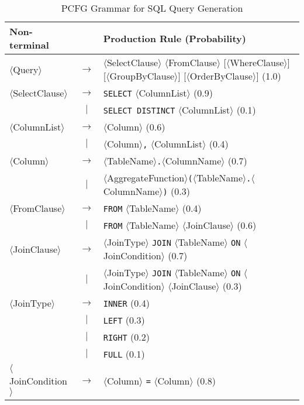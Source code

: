 \begin{table*}[!h]
\centering
\caption{PCFG Grammar for SQL Query Generation}
\label{tab:sql-pcfg}
\begin{tabular}{l@{\ }c@{\ }l}
\toprule
Non-terminal && Production Rule (Probability) \\
\midrule
$\langle$Query$\rangle$ & $\rightarrow$ & $\langle$SelectClause$\rangle$ $\langle$FromClause$\rangle$ [$\langle$WhereClause$\rangle$] [$\langle$GroupByClause$\rangle$] [$\langle$OrderByClause$\rangle$]  (1.0) \\[1ex]
$\langle$SelectClause$\rangle$ & $\rightarrow$ & \texttt{SELECT} $\langle$ColumnList$\rangle$  (0.9) \\
& $|$ & \texttt{SELECT DISTINCT} $\langle$ColumnList$\rangle$  (0.1) \\[1ex]
$\langle$ColumnList$\rangle$ & $\rightarrow$ & $\langle$Column$\rangle$  (0.6) \\
& $|$ & $\langle$Column$\rangle$\texttt{,} $\langle$ColumnList$\rangle$  (0.4) \\[1ex]
$\langle$Column$\rangle$ & $\rightarrow$ & $\langle$TableName$\rangle$\texttt{.}$\langle$ColumnName$\rangle$  (0.7) \\
& $|$ & $\langle$AggregateFunction$\rangle$\texttt{(}$\langle$TableName$\rangle$\texttt{.}$\langle$ColumnName$\rangle$\texttt{)}  (0.3) \\[1ex]
$\langle$FromClause$\rangle$ & $\rightarrow$ & \texttt{FROM} $\langle$TableName$\rangle$  (0.4) \\
& $|$ & \texttt{FROM} $\langle$TableName$\rangle$ $\langle$JoinClause$\rangle$  (0.6) \\[1ex]
$\langle$JoinClause$\rangle$ & $\rightarrow$ & $\langle$JoinType$\rangle$ \texttt{JOIN} $\langle$TableName$\rangle$ \texttt{ON} $\langle$JoinCondition$\rangle$  (0.7) \\
& $|$ & $\langle$JoinType$\rangle$ \texttt{JOIN} $\langle$TableName$\rangle$ \texttt{ON} $\langle$JoinCondition$\rangle$ $\langle$JoinClause$\rangle$  (0.3) \\[1ex]
$\langle$JoinType$\rangle$ & $\rightarrow$ & \texttt{INNER}  (0.4) \\
& $|$ & \texttt{LEFT}  (0.3) \\
& $|$ & \texttt{RIGHT}  (0.2) \\
& $|$ & \texttt{FULL}  (0.1) \\[1ex]
$\langle$JoinCondition$\rangle$ & $\rightarrow$ & $\langle$Column$\rangle$ \texttt{=} $\langle$Column$\rangle$  (0.8) \\

\end{tabular}
\end{table*}
